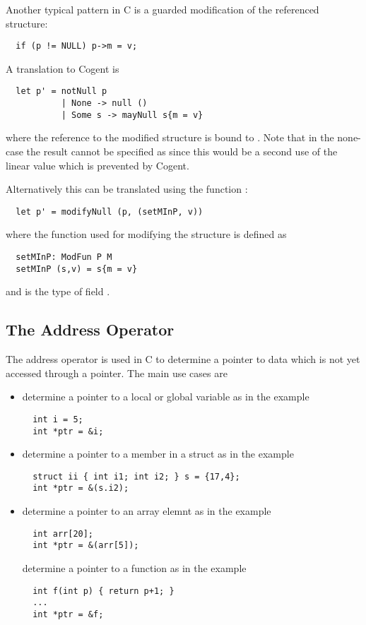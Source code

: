 Another typical pattern in C is a guarded modification of the referenced structure:
\begin{verbatim}
  if (p != NULL) p->m = v;
\end{verbatim}
A translation to Cogent is
\begin{verbatim}
  let p' = notNull p 
           | None -> null ()
           | Some s -> mayNull s{m = v}
\end{verbatim}
where the reference to the modified structure is bound to . Note that in the none-case the result cannot be specified as 
 since this would be a second use of the linear value  which is prevented by Cogent.

Alternatively this can be translated using the function :
\begin{verbatim}
  let p' = modifyNull (p, (setMInP, v))
\end{verbatim}
where the function used for modifying the structure is defined as
\begin{verbatim}
  setMInP: ModFun P M
  setMInP (s,v) = s{m = v}
\end{verbatim}
and  is the type of field .

\subsection{The Address Operator \code{\&}}
\label{app-trans-addrop}

The address operator \code{\&} is used in C to determine a pointer to data which is not yet accessed through a 
pointer. The main use cases are
\begin{itemize}
\item determine a pointer to a local or global variable as in the example
\begin{verbatim}
  int i = 5;
  int *ptr = &i;
\end{verbatim}

\item determine a pointer to a member in a struct as in the example
\begin{verbatim}
  struct ii { int i1; int i2; } s = {17,4};
  int *ptr = &(s.i2);
\end{verbatim}

\item determine a pointer to an array elemnt as in the example
\begin{verbatim}
  int arr[20];
  int *ptr = &(arr[5]);
\end{verbatim}

determine a pointer to a function as in the example
\begin{verbatim}
  int f(int p) { return p+1; }
  ...
  int *ptr = &f;
\end{verbatim}
\end{itemize}

